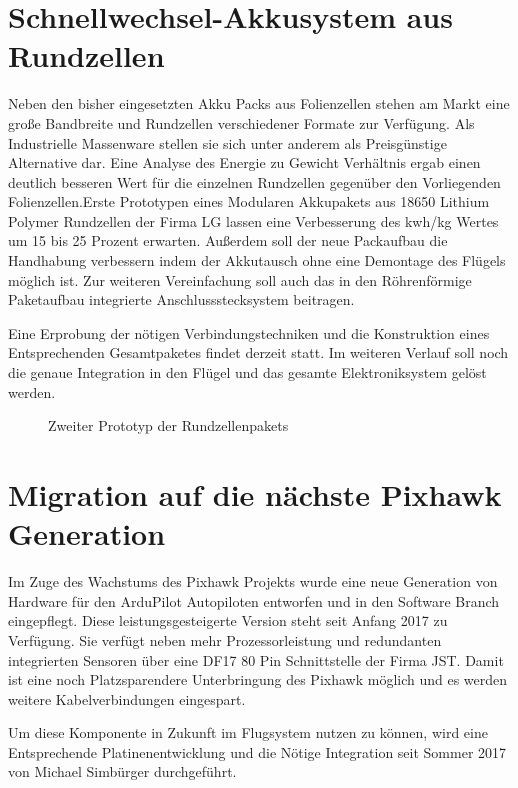 \section{Schnellwechsel-Akkusystem aus Rundzellen}

Neben den bisher eingesetzten Akku Packs aus Folienzellen stehen am Markt eine große Bandbreite und Rundzellen verschiedener Formate zur Verfügung. Als Industrielle Massenware stellen sie sich unter anderem als Preisgünstige Alternative dar.
Eine Analyse des Energie zu Gewicht Verhältnis ergab einen deutlich besseren Wert für die einzelnen Rundzellen gegenüber den Vorliegenden Folienzellen.Erste Prototypen eines Modularen Akkupakets aus 18650 Lithium Polymer Rundzellen der Firma LG lassen eine Verbesserung des kwh/kg Wertes um 15 bis 25 Prozent erwarten.
Außerdem soll der neue Packaufbau die Handhabung verbessern indem der Akkutausch ohne eine Demontage des Flügels möglich ist. Zur weiteren Vereinfachung soll auch das in den Röhrenförmige Paketaufbau integrierte Anschlussstecksystem beitragen.

Eine Erprobung der nötigen Verbindungstechniken und die Konstruktion eines Entsprechenden Gesamtpaketes findet derzeit statt.
Im weiteren Verlauf soll noch die genaue Integration in den Flügel und das gesamte Elektroniksystem gelöst werden.

\begin{figure}[H]
\centering
{}
\caption{Zweiter Prototyp der Rundzellenpakets} 
\label{fig:Zweiter Prototyp der Rundzellenpakets}
\end{figure}


\section{Migration auf die nächste Pixhawk Generation}

Im Zuge des Wachstums des Pixhawk Projekts wurde eine neue Generation von Hardware für den ArduPilot Autopiloten entworfen und in den Software Branch eingepflegt. Diese leistungsgesteigerte Version steht seit Anfang 2017 zu Verfügung.
Sie verfügt neben mehr Prozessorleistung und redundanten integrierten Sensoren über eine DF17 80 Pin Schnittstelle der Firma JST. Damit ist eine noch Platzsparendere Unterbringung des Pixhawk möglich und es werden weitere Kabelverbindungen eingespart.

Um diese Komponente in Zukunft im Flugsystem nutzen zu können, wird eine Entsprechende Platinenentwicklung und die Nötige Integration seit Sommer 2017 von Michael Simbürger durchgeführt\cite{Simburger}.

